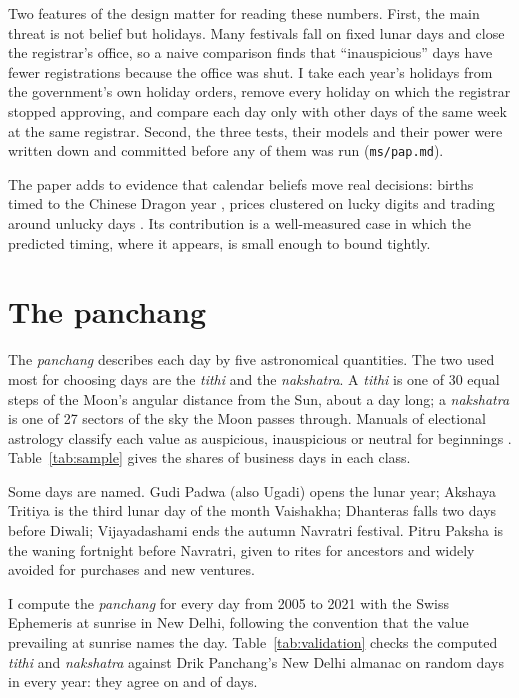 \documentclass[12pt,letterpaper]{article}
\newcommand{\tithi}{\textit{tithi}}
\newcommand{\nakshatra}{\textit{nakshatra}}
\newcommand{\panchang}{\textit{panchang}}
\begin{document}
Two features of the design matter for reading these numbers. First, the main threat is not belief but holidays. Many festivals fall on fixed lunar days and close the registrar's office, so a naive comparison finds that ``inauspicious'' days have fewer registrations because the office was shut. I take each year's holidays from the government's own holiday orders, remove every holiday on which the registrar stopped approving, and compare each day only with other days of the same week at the same registrar. Second, the three tests, their models and their power were written down and committed before any of them was run (\texttt{ms/pap.md}).

The paper adds to evidence that calendar beliefs move real decisions: births timed to the Chinese Dragon year \citep{mocan2017superstition}, prices clustered on lucky digits \citep{brown2008culture} and trading around unlucky days \citep{hirshleifer2018superstition}. Its contribution is a well-measured case in which the predicted timing, where it appears, is small enough to bound tightly.

\section{The panchang}

The \panchang{} describes each day by five astronomical quantities. The two used most for choosing days are the \tithi{} and the \nakshatra. A \tithi{} is one of 30 equal steps of the Moon's angular distance from the Sun, about a day long; a \nakshatra{} is one of 27 sectors of the sky the Moon passes through. Manuals of electional astrology classify each value as auspicious, inauspicious or neutral for beginnings \citep{kane1974history}. Table~\ref{tab:sample} gives the shares of business days in each class.

Some days are named. Gudi Padwa (also Ugadi) opens the lunar year; Akshaya Tritiya is the third lunar day of the month Vaishakha; Dhanteras falls two days before Diwali; Vijayadashami ends the autumn Navratri festival. Pitru Paksha is the waning fortnight before Navratri, given to rites for ancestors and widely avoided for purchases and new ventures.

I compute the \panchang{} for every day from 2005 to 2021 with the Swiss Ephemeris \citep{swisseph2024} at sunrise in New Delhi, following the convention that the value prevailing at sunrise names the day. Table~\ref{tab:validation} checks the computed \tithi{} and \nakshatra{} against Drik Panchang's New Delhi almanac \citep{drikpanchang2024} on random days in every year: they agree on \ValTithi{} and \ValNak{} of \NValDays{} days.
\end{document}
